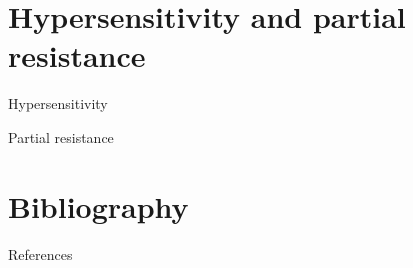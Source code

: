 \documentclass[11pt,dvipsnames,ignorenonframetext,aspectratio=169]{beamer}
\begin{document}
\hypertarget{hypersensitivity-and-partial-resistance}{%
\section{Hypersensitivity and partial
resistance}\label{hypersensitivity-and-partial-resistance}}

\begin{frame}{Hypersensitivity}
\protect\hypertarget{hypersensitivity}{}
\end{frame}

\begin{frame}{Partial resistance}
\protect\hypertarget{partial-resistance}{}
\end{frame}

\hypertarget{bibliography}{%
\section{Bibliography}\label{bibliography}}

\begin{frame}{References}
\protect\hypertarget{references}{}
\end{frame}
\end{document}
